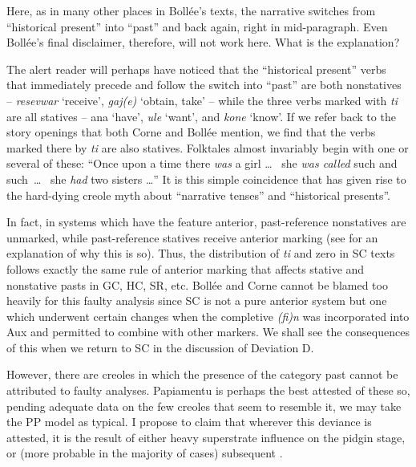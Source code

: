 Here, as in many other places in Bollée's texts, the narrative switches from ``historical present'' into ``past'' and back again, right in mid-paragraph. Even Bollée's final disclaimer, therefore, will not work here. What is the explanation?

The alert reader will perhaps have noticed that the ``historical present'' verbs that immediately precede and follow the switch into ``past'' are both nonstatives -- \textit{resevwar} `receive', \textit{gaj(e)} `obtain, take' -- while the three verbs marked with \textit{ti} are all statives -- ana `have', \textit{ule} `want', and \textit{kone} `know'. If we refer back to the story openings that both Corne and Bollée mention, we find that the verbs marked there by \textit{ti} are also statives. Folktales almost invariably begin with one or several of these: ``Once upon a time there \textit{was} a girl \ldots~ she \textit{was called} such and such~\ldots~ she \textit{had} two sisters \ldots '' It is this simple coincidence that has given rise to the hard-dying creole myth about ``narrative tenses'' and ``historical presents''.

In fact, in systems which have the feature anterior, past-reference nonstatives are unmarked, while past-reference statives receive anterior
marking (see \citet[Chapter 2]{Bickerton1975} for an explanation of why this is so). Thus, the distribution of \textit{ti} and zero in SC texts follows exactly the same rule of anterior marking that affects stative and nonstative pasts in GC, HC, SR, etc.
Bollée and Corne cannot be blamed too heavily for this faulty analysis since SC is not a pure anterior system but one which under\-went certain changes when the completive \textit{(fi)n} was incorporated into Aux and permitted to combine with other markers. We shall see the consequences of this when we return to SC in the discussion of Deviation D.

However, there are creoles in which the presence of the category past cannot be attributed to faulty analyses. Papiamentu is perhaps the best attested of these so, pending adequate data on the few creoles that seem to resemble it, we may take the PP model as typical. I pro\-pose to claim that wherever this deviance is attested, it is the result of either heavy superstrate influence on the pidgin stage, or (more prob\-able in the majority of cases) subsequent .

